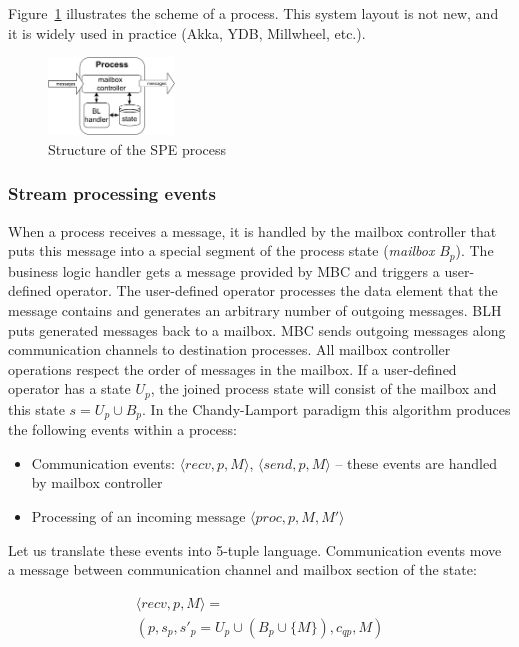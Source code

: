 Figure~\ref{fig:spe_process} illustrates the scheme of a process. This system layout is not new, and it is widely used in practice (Akka, YDB, Millwheel, etc.).

\begin{figure}[t]
  \centering
  \includegraphics[width=0.3\textwidth]{pics/process-scheme.pdf}
  \caption{Structure of the SPE process}
  \label{fig:spe_process}
\end{figure}

\subsubsection{Stream processing events}

When a process receives a message, it is handled by the mailbox controller that puts this message into a special segment of the process state ({\em mailbox} $B_p$). The business logic handler gets a message provided by MBC and triggers a user-defined operator. The user-defined operator processes the data element that the message contains and generates an arbitrary number of outgoing messages. BLH puts generated messages back to a mailbox. MBC sends outgoing messages along communication channels to destination processes. All mailbox controller operations respect the order of messages in the mailbox. If a user-defined operator has a state $U_p$, the joined process state will consist of the mailbox and this state $s=U_p \cup B_p$. In the Chandy-Lamport paradigm this algorithm produces the following events within a process:
\begin{itemize}
    \item Communication events: $\langle recv, p, M\rangle$, $\langle send, p, M \rangle$ -- these events are handled by mailbox controller
    \item Processing of an incoming message $\langle proc, p, M, M' \rangle$
\end{itemize}

Let us translate these events into 5-tuple language. Communication events move a message between communication channel and mailbox section of the state:

\begin{multline}
\langle recv, p, M\rangle = \\ (p, s_p, s'_p = U_p \cup \left(B_p \cup \{M\}\right), c_{qp}, M)
\end{multline}

